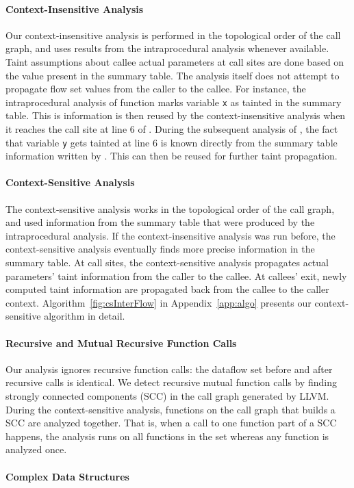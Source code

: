 \paragraph{Context-Insensitive Analysis}
Our context-insensitive analysis is performed
in the topological order of the call graph, and uses
results from the intraprocedural analysis whenever
available. Taint assumptions about callee actual
parameters at call sites are done based on the value
present in the summary table. The analysis itself does not
attempt to propagate flow set values from the caller
to the callee.
For instance, the intraprocedural analysis of function
\main{} marks variable \texttt{x} as tainted in the
summary table. This is information is then reused by
the context-insensitive analysis when it reaches the
call site at line $6$ of \main{}.
During the subsequent analysis of \main{}, the fact that
variable \texttt{y} gets tainted at line $6$ is known
directly from the summary table information written
by \compute{}. This can then be reused for further
taint propagation.

\paragraph{Context-Sensitive Analysis}
The context-sensitive analysis works in the topological order
of the call graph, and used information from the summary table
that were produced by the intraprocedural analysis. If the
context-insensitive analysis was run before, the context-sensitive
analysis eventually finds more precise information in the summary
table.
At call sites, the context-sensitive analysis propagates
actual parameters' taint information from the caller to the
callee. At callees' exit, newly computed taint information
are propagated back from the callee to the caller context.
Algorithm~\ref{fig:csInterFlow} in Appendix~\ref{app:algo}
presents our context-sensitive algorithm in detail.

\paragraph{Recursive and Mutual Recursive Function Calls} 
Our analysis ignores recursive function calls: the dataflow set
before and after recursive calls is identical.
We detect recursive mutual function calls by finding strongly
connected components (SCC) in the call graph generated by LLVM.
During the context-sensitive analysis, functions on the call
graph that builds a SCC are analyzed together. That is, when a
call to one function part of a SCC happens, the analysis runs
on all functions in the set whereas any function is analyzed
once.

\paragraph{Complex Data Structures}
